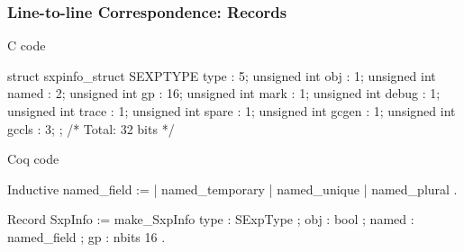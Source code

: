 \documentclass{beamer}
\begin{document}
\begin{frame}[fragile]
    \frametitle{Line-to-line Correspondence: Records}

        \begin{widemargin}
            \centering{}
    \begin{minipage}{.5\textwidth}
        C code

\begin{ccode}
struct sxpinfo_struct {
  SEXPTYPE type      :  5;
  unsigned int obj   :  1;
  unsigned int named :  2;
  unsigned int gp    : 16;
  unsigned int mark  :  1;
  unsigned int debug :  1;
  unsigned int trace :  1;
  unsigned int spare :  1;
  unsigned int gcgen :  1;
  unsigned int gccls :  3;
};
/* Total: 32 bits */
\end{ccode}

    \end{minipage}
    \qquad
    \begin{minipage}{.47\textwidth}
        Coq code

\begin{coqcode}
Inductive named_field :=
  | named_temporary
  | named_unique
  | named_plural
  .

Record SxpInfo :=
  make_SxpInfo {
    type : SExpType ;
    obj : bool ;
    named : named_field ;
    gp : nbits 16
  }.
\end{coqcode}

    \end{minipage}
    \end{widemargin}


\end{frame}
\end{document}
